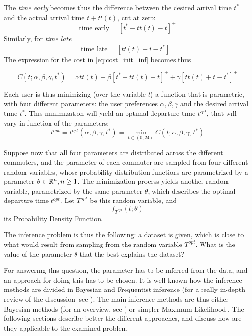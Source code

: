 The \textit{time early} becomes thus the difference between the desired arrival time \(t^*\) and the actual arrival time \(t + tt(t)\), cut at zero:
\[\text{time early} = [t^* - tt(t) - t]^+\]
Similarly, for \textit{time late}
\[\text{time late} = [tt(t) + t - t^*]^+\]
The expression for the cost in \eqref{eq:cost_init_inf} becomes thus

\begin{equation}
  \label{eq:cost_inf}
  C(t; \alpha, \beta, \gamma, t^*) = \alpha tt(t) + \beta [t^* - tt(t) - t]^+ + \gamma[tt(t) + t - t^*]^+
\end{equation}

Each user is thus minimizing (over the variable \(t\))
a function that is parametric, with four different parameters:
the user preferences \(\alpha, \beta, \gamma\) and the desired arrival time \(t^*\).
This minimization will yield an optimal departure time \(t^{opt}\),
that will vary in function of the parameters:
\begin{equation}
  \label{eq:t_opt}
  t^{opt} = t^{opt}(\alpha, \beta, \gamma, t^*) = \min_{t \in (0, 24)} C(t; \alpha, \beta, \gamma, t^*)
\end{equation}

Suppose now that all four parameters are distributed across the different commuters,
and the parameter of each commuter are sampled from four different random variables,
whose probability distribution functions  are parametrized by a parameter \(\theta \in \mathbb{R}^n, n \geq 1\).
The minimization process yields another random variable, parametrized by the same parameter \(\theta\),
which describes the optimal departure time \(t^{opt}\).
Let \(T^{opt}\) be this random variable, and
\begin{equation}
  \label{eq:pdf_opt}
  f_{T^{opt}}(t; \theta)
\end{equation}
its Probability Density Function.

The inference problem is thus the following:
a dataset is given,
which is close to what would result from sampling from the random variable \(T^{opt}\).
What is the value of the parameter \(\theta\) that the best explains the dataset?

For answering this question, the parameter has to be inferred from the data,
and an approach for doing this has to be chosen.
It is well known how the inference methods are divided in Bayesian and Frequentist inference
(for a really in-depth review of the discussion, see \cite{bandyopadhyay2011philosophy}).
The main inference methods are thus either Bayesian methods (for an overview, see \cite{gelman2013bayesian}) or simpler Maximum Likelihood \parencite{doi:10.1098/rsta.1922.0009}.
The following sections describe better the different approaches,
and discuss how are they applicable to the examined problem

